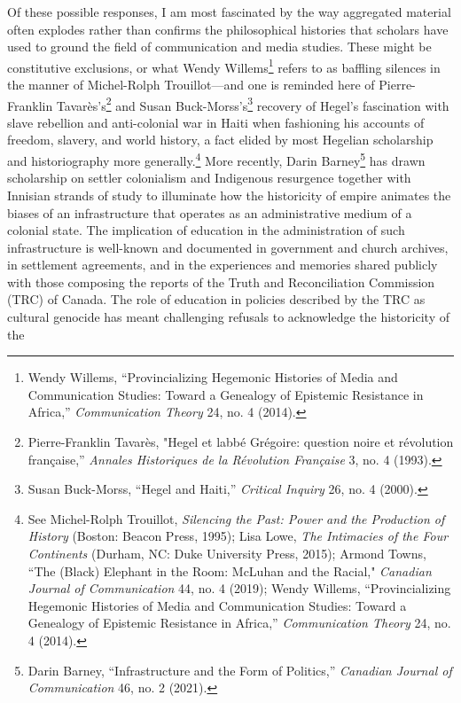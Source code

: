 \documentclass{tufte-handout}
\begin{document}
Of these possible responses, I am most fascinated by the way aggregated
material often explodes rather than confirms the philosophical histories
that scholars have used to ground the field of communication and media
studies. These might be constitutive exclusions, or what Wendy
Willems\footnote{Wendy Willems, ``Provincializing Hegemonic Histories of
  Media and Communication Studies: Toward a Genealogy of Epistemic
  Resistance in Africa,'' \emph{Communication Theory} 24, no. 4 (2014).}
refers to as baffling silences in the manner of Michel-Rolph
Trouillot---and one is reminded here of Pierre-Franklin
Tavarès's\footnote{Pierre-Franklin Tavarès, "Hegel et
  l\textquotesingle abbé Grégoire: question noire et révolution
  française,'' \emph{Annales Historiques de la Révolution Française} 3,
  no. 4 (1993).} and Susan Buck-Morss's\footnote{Susan Buck-Morss,
  ``Hegel and Haiti,'' \emph{Critical Inquiry} 26, no. 4 (2000).}
recovery of Hegel's fascination with slave rebellion and anti-colonial
war in Haiti when fashioning his accounts of freedom, slavery, and world
history, a fact elided by most Hegelian scholarship and historiography
more generally.\footnote{See Michel-Rolph Trouillot, \emph{Silencing the
  Past: Power and the Production of History} (Boston: Beacon Press,
  1995); Lisa Lowe, \emph{The Intimacies of the Four Continents}
  (Durham, NC: Duke University Press, 2015); Armond Towns, ``The (Black)
  Elephant in the Room: McLuhan and the Racial," \emph{Canadian Journal
  of Communication} 44, no. 4 (2019); Wendy Willems, ``Provincializing
  Hegemonic Histories of Media and Communication Studies: Toward a
  Genealogy of Epistemic Resistance in Africa,'' \emph{Communication
  Theory} 24, no. 4 (2014).} More recently, Darin Barney\footnote{Darin
  Barney, ``Infrastructure and the Form of Politics,'' \emph{Canadian
  Journal of Communication} 46, no. 2 (2021).} has drawn scholarship on
settler colonialism and Indigenous resurgence together with Innisian
strands of study to illuminate how the historicity of empire animates
the biases of an infrastructure that operates as an administrative
medium of a colonial state. The implication of education in the
administration of such infrastructure is well-known and documented in
government and church archives, in settlement agreements, and in the
experiences and memories shared publicly with those composing the
reports of the Truth and Reconciliation Commission (TRC) of Canada. The
role of education in policies described by the TRC as cultural genocide
has meant challenging refusals to acknowledge the historicity of the
\end{document}
